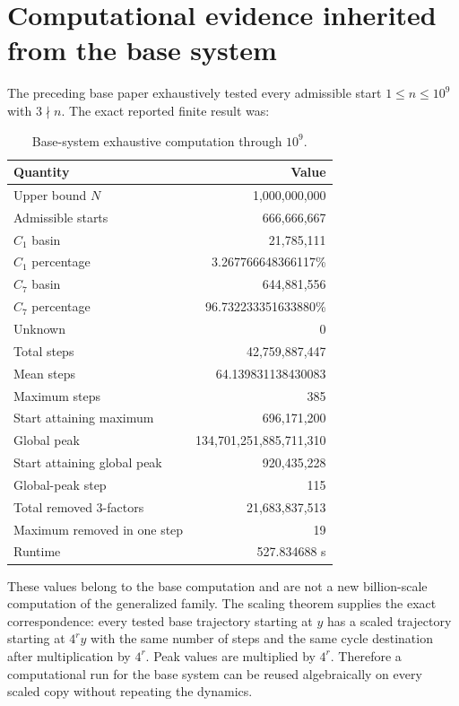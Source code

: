 \documentclass[11pt]{article}
\begin{document}
\section{Computational evidence inherited from the base system}
The preceding base paper exhaustively tested every admissible start $1\le n\le10^9$ with $3\nmid n$. The exact reported finite result was:

\begin{table}[h]
\centering
\caption{Base-system exhaustive computation through $10^9$.}
\begin{tabular}{lr}
\toprule
Quantity & Value\\
\midrule
Upper bound $N$ & 1,000,000,000\\
Admissible starts & 666,666,667\\
$C_1$ basin & 21,785,111\\
$C_1$ percentage & 3.267766648366117\%\\
$C_7$ basin & 644,881,556\\
$C_7$ percentage & 96.732233351633880\%\\
Unknown & 0\\
Total steps & 42,759,887,447\\
Mean steps & 64.139831138430083\\
Maximum steps & 385\\
Start attaining maximum & 696,171,200\\
Global peak & 134,701,251,885,711,310\\
Start attaining global peak & 920,435,228\\
Global-peak step & 115\\
Total removed $3$-factors & 21,683,837,513\\
Maximum removed in one step & 19\\
Runtime & 527.834688 s\\
\bottomrule
\end{tabular}
\end{table}

These values belong to the base computation and are not a new billion-scale computation of the generalized family. The scaling theorem supplies the exact correspondence: every tested base trajectory starting at $y$ has a scaled trajectory starting at $4^ry$ with the same number of steps and the same cycle destination after multiplication by $4^r$. Peak values are multiplied by $4^r$. Therefore a computational run for the base system can be reused algebraically on every scaled copy without repeating the dynamics.
\end{document}
